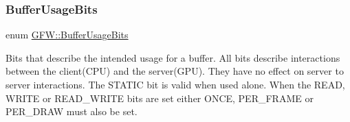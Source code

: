 \subsubsection{\texorpdfstring{Buffer\+Usage\+Bits}{BufferUsageBits}}
{\footnotesize\ttfamily enum \hyperlink{namespace_g_f_w_a51791713eb2c4bd7901142f4e62a88e6}{G\+F\+W\+::\+Buffer\+Usage\+Bits}}



Bits that describe the intended usage for a buffer. All bits describe interactions between the client(\+C\+P\+U) and the server(\+G\+P\+U). They have no effect on server to server interactions. The S\+T\+A\+T\+IC bit is valid when used alone. When the R\+E\+AD, W\+R\+I\+TE or R\+E\+A\+D\+\_\+\+W\+R\+I\+TE bits are set either O\+N\+CE, P\+E\+R\+\_\+\+F\+R\+A\+ME or P\+E\+R\+\_\+\+D\+R\+AW must also be set. 

